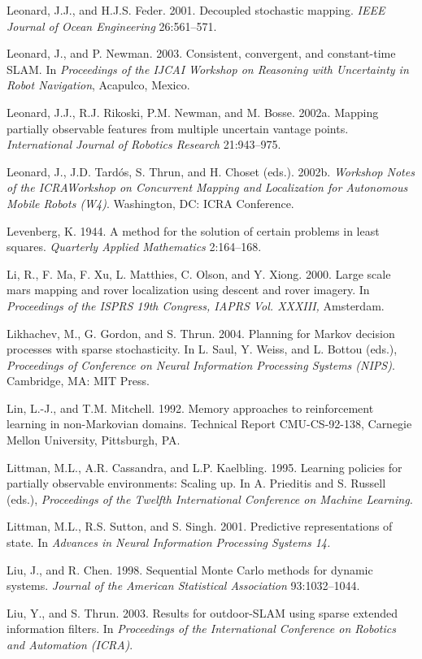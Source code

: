 \documentclass[10pt,a4paper]{article}
\begin{document}
Leonard, J.J., and H.J.S. Feder. 2001. Decoupled stochastic mapping. \textit{IEEE Journal of
Ocean Engineering} 26:561–571.

Leonard, J., and P. Newman. 2003. Consistent, convergent, and constant-time SLAM.
In \textit{Proceedings of the IJCAI Workshop on Reasoning with Uncertainty in Robot Navigation},
Acapulco, Mexico.

Leonard, J.J., R.J. Rikoski, P.M. Newman, and M. Bosse. 2002a. Mapping partially
observable features from multiple uncertain vantage points. \textit{International Journal of
Robotics Research} 21:943–975.

Leonard, J., J.D. Tardós, S. Thrun, and H. Choset (eds.). 2002b. \textit{Workshop Notes of the
ICRAWorkshop on Concurrent Mapping and Localization for Autonomous Mobile Robots
(W4)}. Washington, DC: ICRA Conference.

Levenberg, K. 1944. A method for the solution of certain problems in least squares.
\textit{Quarterly Applied Mathematics} 2:164–168.

Li, R., F. Ma, F. Xu, L. Matthies, C. Olson, and Y. Xiong. 2000. Large scale mars
mapping and rover localization using descent and rover imagery. In \textit{Proceedings of
the ISPRS 19th Congress, IAPRS Vol. XXXIII,} Amsterdam.

Likhachev, M., G. Gordon, and S. Thrun. 2004. Planning for Markov decision processes
with sparse stochasticity. In L. Saul, Y. Weiss, and L. Bottou (eds.), \textit{Proceedings
of Conference on Neural Information Processing Systems (NIPS)}. Cambridge, MA:
MIT Press.

Lin, L.-J., and T.M. Mitchell. 1992. Memory approaches to reinforcement learning
in non-Markovian domains. Technical Report CMU-CS-92-138, Carnegie Mellon
University, Pittsburgh, PA.

Littman, M.L., A.R. Cassandra, and L.P. Kaelbling. 1995. Learning policies for partially
observable environments: Scaling up. In A. Prieditis and S. Russell (eds.),
\textit{Proceedings of the Twelfth International Conference on Machine Learning.}

Littman, M.L., R.S. Sutton, and S. Singh. 2001. Predictive representations of state. In
\textit{Advances in Neural Information Processing Systems 14.}

Liu, J., and R. Chen. 1998. Sequential Monte Carlo methods for dynamic systems.
\textit{Journal of the American Statistical Association} 93:1032–1044.

Liu, Y., and S. Thrun. 2003. Results for outdoor-SLAM using sparse extended information
filters. In \textit{Proceedings of the International Conference on Robotics and Automation
(ICRA)}.
\end{document}
